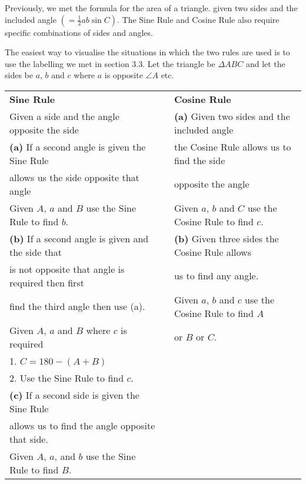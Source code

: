 Previously, we met the formula
for the area of a triangle. given two sides and the included angle $\left ( =\frac{1}{2} a b \sin  C\right )$. The Sine Rule and
Cosine Rule also require specific combinations of sides and angles. 

The easiest way to visualise the situations in which the two rules
are used is to use the labelling we met in section $3.3$. Let the triangle be $ \Delta A B C$ and let the sides be $a$, $b$ and $c$ where $a$ is opposite $\angle A$ etc. 

   
\setlength\fboxrule{0in}\setlength\fboxsep{0.2in}



\begin{tabular}[c]{lll}\textbf{Sine Rule}  &  & \textbf{Cosine
Rule}  \\
 Given a side and the angle opposite the side  &  & \textbf{(a)}
Given two sides and the included angle  \\
 \textbf{(a)} If a second angle is
given the Sine Rule  &  & the Cosine Rule allows us to find the
side  \\
allows us the side opposite that angle  &  & opposite
the angle  \\
Given $A$, $a$ and $B$ use the Sine Rule to find $b\text{.}$  &  & Given $a$, $b$ and $C$ use the Cosine Rule to find $c\text{.}$  \\
 \textbf{(b)} If a second
angle is given and the side that  &  & \textbf{(b)} Given three
sides the Cosine Rule allows  \\
is not opposite that angle is required then first  &  & us
to find any angle.  \\
find the third angle then use (a).  &  & Given
$a$, $b$ and $c$ use the Cosine Rule to find $A$  \\
Given $A$, $a$ and $B$ where $c$ is required  &  & or $B$ or $C$.  \\
 1. $C =180 -(A +B)$  &  &  \\
2.
Use the Sine Rule to find $c$.  &  &  \\
\textbf{(c)} If a second side is given the Sine Rule  &  &  \\
allows
us to find the angle opposite that side.  &  &  \\
Given
$A$, $a$, and $b$ use the Sine Rule to find $B$.  &  &  \\
\end{tabular}

